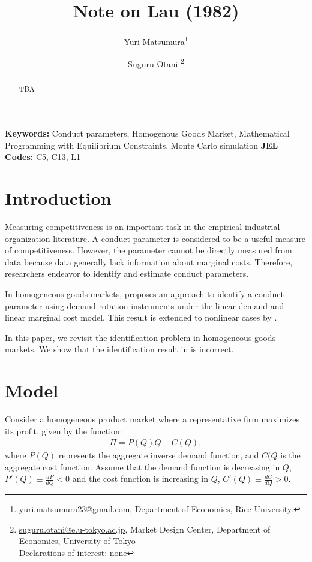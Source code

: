 \documentclass[11pt, a4paper]{article}
\title{Note on Lau (1982)}
\author{Yuri Matsumura\thanks{\href{mailto:}{yuri.matsumura23@gmail.com}, Department of Economics, Rice University.} \and Suguru Otani \thanks{\href{mailto:}{suguru.otani@e.u-tokyo.ac.jp}, Market Design Center, Department of Economics, University of Tokyo
\\Declarations of interest: none %
}}
\theoremstyle{remark}
\begin{document}
\maketitle
\begin{abstract}
    TBA
\end{abstract}

\noindent\textbf{Keywords:} Conduct parameters, Homogenous Goods Market, Mathematical Programming with Equilibrium Constraints, Monte Carlo simulation
\vspace{0in}
\newline
\noindent\textbf{JEL Codes:} C5, C13, L1

\bigskip





\section{Introduction}
Measuring competitiveness is an important task in the empirical industrial organization literature.
A conduct parameter is considered to be a useful measure of competitiveness. 
However, the parameter cannot be directly measured from data because data generally lack information about marginal costs.
Therefore, researchers endeavor to identify and estimate conduct parameters.


In homogeneous goods markets, \citet{bresnahan1982oligopoly} proposes an approach to identify a conduct parameter using demand rotation instruments under the linear demand and linear marginal cost model.
This result is extended to nonlinear cases by \citet{lau1982identifying}.

In this paper, we revisit the identification problem in homogeneous goods markets.
We show that the identification result in \citet{lau1982identifying} is incorrect.

















\section{Model}
Consider a homogeneous product market where a representative firm maximizes its profit, given by the function:
\begin{align}
    \Pi = P(Q)Q - C(Q),
\end{align}
where $P(Q)$ represents the aggregate inverse demand function, and $C(Q$ is the aggregate cost function.
Assume that the demand function is decreasing in $Q$, $P'(Q) \equiv \frac{dP}{dQ} < 0$ and the cost function is increasing in $Q$, $C'(Q) \equiv \frac{dC}{dQ} > 0$.
\end{document}
